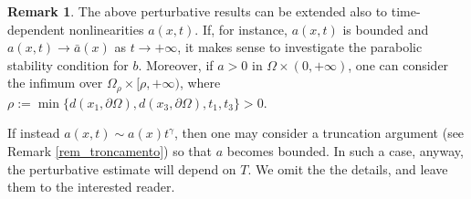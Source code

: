 \documentclass[11pt, reqno]{amsart}
\theoremstyle{definition}
\newtheorem{remark}[lemma]{Remark}
\numberwithin{equation}{section}
\begin{document}
\begin{remark}\label{rem_time_dependence}
The above perturbative results can be extended also to time-dependent nonlinearities $a(x,t)$. 
If, for instance, $a(x,t)$ is bounded and $a(x,t)\to \bar{a}(x)$ as $t\to +\infty$, it makes sense to investigate the parabolic stability condition for $b$. 
Moreover, if $a>0$ in $\Omega \times (0,+\infty)$, one can consider the infimum over $\Omega_{\rho} \times [\rho, +\infty)$, where $\rho:=\min \big\{d(x_1,\partial\Omega),d(x_3,\partial \Omega), t_1, t_3\big\}>0$.

If instead $a(x,t) \sim a(x) t^{\gamma}$, then one may consider a truncation argument (see Remark \ref{rem_troncamento}) so that $a$ becomes bounded. 
In such a case, anyway, the perturbative estimate will depend on $T$.
We omit the the details, and leave them to the interested reader. 
\end{remark}
 
 
\end{document}
